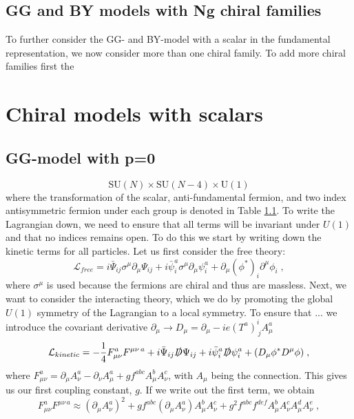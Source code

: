 \subsection{GG and BY models with Ng chiral families}
To further consider the GG- and BY-model with a scalar in the fundamental representation, we now consider more than one chiral family. To add more chiral families first the  

\section{Chiral models with scalars}
\subsection{GG-model with p=0}

\begin{equation}
    \text{SU}(N)\times \text{SU}(N-4)\times \text{U}(1)
\end{equation}
where the transformation of the scalar, anti-fundamental fermion, and two index antisymmetric fermion under each group is denoted in Table \ref{}.
To write the Lagrangian down, we need to ensure that all terms will be invariant under $U(1)$ and that no indices remains open. To do this we start by writing down the kinetic terms for all particles. Let us first consider the free theory:
\begin{equation}
    \mathcal{L}_{free}= i \bar \Psi_{ij}\sigma^\mu \partial_\mu\Psi_{ij}+i \bar \psi_i^a\sigma^\mu \partial_\mu\psi_i^a+\partial_\mu (\phi^*)_i\partial^\mu\phi_i\;,
\end{equation}
where $\sigma^\mu$ is used because the fermions are chiral and thus are massless. Next, we want to consider the interacting theory, which we do by promoting the global $U(1)$ symmetry of the Lagrangian to a local symmetry. To ensure that ... we introduce the covariant derivative $\partial_\mu \to D_\mu= \partial_\mu - ie(T^a)^i_{\,j}A_\mu^a$
\begin{equation}
    \mathcal{L}_{kinetic}= -\frac{1}{4} F_{\mu\nu}^a F^{\mu\nu\,a}+i \bar \Psi_{ij}\slashed{D}\Psi_{ij}+i \bar \psi_i^a\slashed{D}\psi_i^a+(D_\mu \phi^*D^\mu\phi)\;,
\end{equation}
where $F_{\mu\nu}^a=\partial_\mu A_\nu^a-\partial_\nu A_\mu ^a+g f^{abc}A_\mu^bA_\nu^c$, with $A_\mu$ being the connection. This gives us our first coupling constant, $g$. If we write out the first term, we obtain
\begin{equation}
    F_{\mu\nu}^a F^{\mu\nu\,a}\approx(\partial_\mu A_\nu^a)^2+ g f^{abc}(\partial_\mu A_\nu^a)A_\mu^bA_\nu^c +g^2 f^{abc}f^{def}A_\mu^bA_\nu^cA_\mu^dA_\nu^e\;,
\end{equation}
